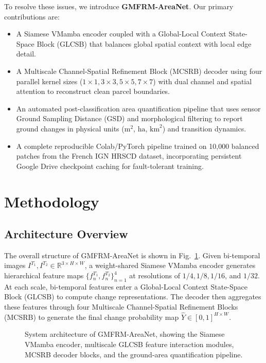 \documentclass[final,5p,times,twocolumn]{elsarticle}
\begin{document}
To resolve these issues, we introduce \textbf{GMFRM-AreaNet}. Our primary contributions are:
\begin{itemize}
    \item A Siamese VMamba encoder coupled with a Global-Local Context State-Space Block (GLCSB) that balances global spatial context with local edge detail.
    \item A Multiscale Channel-Spatial Refinement Block (MCSRB) decoder using four parallel kernel sizes ($1\times1, 3\times3, 5\times5, 7\times7$) with dual channel and spatial attention to reconstruct clean parcel boundaries.
    \item An automated post-classification area quantification pipeline that uses sensor Ground Sampling Distance (GSD) and morphological filtering to report ground changes in physical units ($\text{m}^2$, $\text{ha}$, $\text{km}^2$) and transition dynamics.
    \item A complete reproducible Colab/PyTorch pipeline trained on 10,000 balanced patches from the French IGN HRSCD dataset, incorporating persistent Google Drive checkpoint caching for fault-tolerant training.
\end{itemize}

\section{Methodology}
\label{sec:method}

\subsection{Architecture Overview}
The overall structure of GMFRM-AreaNet is shown in Fig.~\ref{fig:arch}. Given bi-temporal images $I^{T_1}, I^{T_2} \in \mathbb{R}^{3 \times H \times W}$, a weight-shared Siamese VMamba encoder generates hierarchical feature maps $\{f^{T_1}_n, f^{T_2}_n\}_{n=1}^4$ at resolutions of $1/4, 1/8, 1/16$, and $1/32$. At each scale, bi-temporal features enter a Global-Local Context State-Space Block (GLCSB) to compute change representations. The decoder then aggregates these features through four Multiscale Channel-Spatial Refinement Blocks (MCSRB) to generate the final change probability map $\hat{Y} \in [0, 1]^{H \times W}$.

\begin{figure}[!t]
\centering
\caption{System architecture of GMFRM-AreaNet, showing the Siamese VMamba encoder, multiscale GLCSB feature interaction modules, MCSRB decoder blocks, and the ground-area quantification pipeline.}
\label{fig:arch}
\end{figure}
\end{document}
